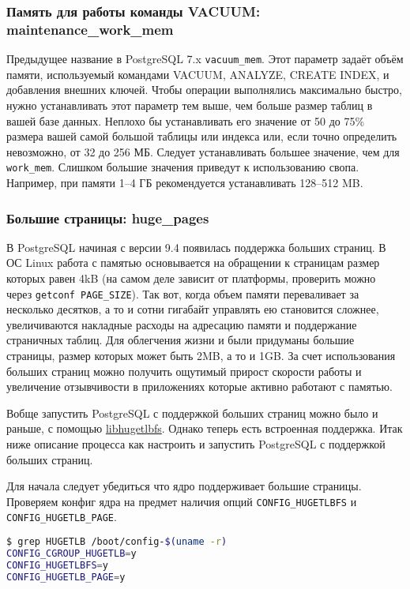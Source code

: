 \subsubsection{Память для работы команды VACUUM: maintenance\_work\_mem}


Предыдущее название в PostgreSQL 7.x \lstinline!vacuum_mem!. Этот параметр задаёт объём памяти, используемый командами VACUUM, ANALYZE, CREATE INDEX, и добавления внешних ключей. Чтобы операции выполнялись максимально быстро, нужно устанавливать этот параметр тем выше, чем больше размер таблиц в вашей базе данных. Неплохо бы устанавливать его значение от 50 до 75\% размера вашей самой большой таблицы или индекса или, если точно определить невозможно, от 32 до 256 МБ. Следует устанавливать большее значение, чем для \lstinline!work_mem!. Слишком большие значения приведут к использованию свопа. Например, при памяти 1--4 ГБ рекомендуется устанавливать 128--512 MB.


\subsubsection{Большие страницы: huge\_pages}


В PostgreSQL начиная с версии 9.4 появилась поддержка больших страниц. В ОС Linux работа с памятью основывается на обращении к страницам размер которых равен 4kB (на самом деле зависит от платформы, проверить можно через \lstinline!getconf PAGE_SIZE!). Так вот, когда объем памяти переваливает за несколько десятков, а то и сотни гигабайт управлять ею становится сложнее, увеличиваются накладные расходы на адресацию памяти и поддержание страничных таблиц. Для облегчения жизни и были придуманы большие страницы, размер которых может быть 2MB, а то и 1GB. За счет использования больших страниц можно получить ощутимый прирост скорости работы и увеличение отзывчивости в приложениях которые активно работают с памятью.

Вобще запустить PostgreSQL с поддержкой больших страниц можно было и раньше, с помощью \href{http://www.thislinux.org/2012/08/postgresql-with-hugepages.html}{libhugetlbfs}. Однако теперь есть встроенная поддержка. Итак ниже описание процесса как настроить и запустить PostgreSQL с поддержкой больших страниц.

Для начала следует убедиться что ядро поддерживает большие страницы. Проверяем конфиг ядра на предмет наличия опций \lstinline!CONFIG_HUGETLBFS! и \lstinline!CONFIG_HUGETLB_PAGE!.

\begin{lstlisting}[language=Bash,label=lst:settings_hugepages1,caption=Проверка конфига ядра на поддержку huge pages]
$ grep HUGETLB /boot/config-$(uname -r)
CONFIG_CGROUP_HUGETLB=y
CONFIG_HUGETLBFS=y
CONFIG_HUGETLB_PAGE=y
\end{lstlisting}

